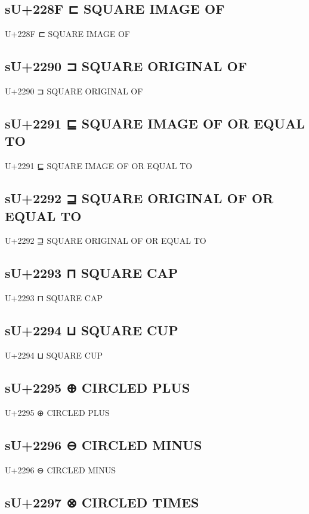 \subsection{sU+228F ⊏ SQUARE IMAGE OF}

U+228F ⊏ SQUARE IMAGE OF

\subsection{sU+2290 ⊐ SQUARE ORIGINAL OF}

U+2290 ⊐ SQUARE ORIGINAL OF

\subsection{sU+2291 ⊑ SQUARE IMAGE OF OR EQUAL TO}

U+2291 ⊑ SQUARE IMAGE OF OR EQUAL TO

\subsection{sU+2292 ⊒ SQUARE ORIGINAL OF OR EQUAL TO}

U+2292 ⊒ SQUARE ORIGINAL OF OR EQUAL TO

\subsection{sU+2293 ⊓ SQUARE CAP}

U+2293 ⊓ SQUARE CAP

\subsection{sU+2294 ⊔ SQUARE CUP}

U+2294 ⊔ SQUARE CUP

\subsection{sU+2295 ⊕ CIRCLED PLUS}

U+2295 ⊕ CIRCLED PLUS

\subsection{sU+2296 ⊖ CIRCLED MINUS}

U+2296 ⊖ CIRCLED MINUS

\subsection{sU+2297 ⊗ CIRCLED TIMES}

